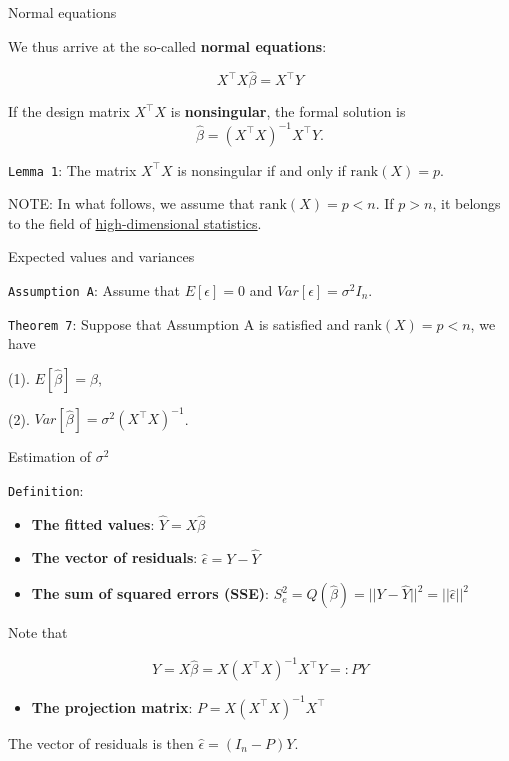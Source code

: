 \documentclass[ignorenonframetext,]{beamer}
\providecommand{\tightlist}{%
  \setlength{\itemsep}{0pt}\setlength{\parskip}{0pt}}
\begin{document}
\begin{frame}[fragile]{Normal equations}
\protect\hypertarget{normal-equations}{}

We thus arrive at the so-called \textbf{normal equations}:

\[X^\top X\hat\beta = X^\top Y\]

If the design matrix \(X^\top X\) is \textbf{nonsingular}, the formal
solution is \[\hat\beta = (X^\top X)^{-1}X^\top Y.\]

\texttt{Lemma\ 1}: The matrix \(X^\top X\) is nonsingular if and only if
\(\mathrm{rank}(X)=p\).

NOTE: In what follows, we assume that \(\mathrm{rank}(X)=p<n\). If
\(p>n\), it belongs to the field of
\href{https://en.wikipedia.org/wiki/High-dimensional_statistic}{high-dimensional
statistics}.

\end{frame}

\begin{frame}[fragile]{Expected values and variances}
\protect\hypertarget{expected-values-and-variances-1}{}

\texttt{Assumption\ A}: Assume that \(E[\epsilon]=0\) and
\(Var[\epsilon]=\sigma^2I_n\).

\texttt{Theorem\ 7}: Suppose that Assumption A is satisfied and
\(\mathrm{rank}(X)=p<n\), we have

(1). \(E[\hat\beta]=\beta,\)

(2). \(Var[\hat\beta]=\sigma^2(X^\top X)^{-1}\).

\end{frame}

\begin{frame}[fragile]{Estimation of \(\sigma^2\)}
\protect\hypertarget{estimation-of-sigma2-1}{}

\texttt{Definition}:

\begin{itemize}
\item
  \textbf{The fitted values}: \(\hat Y = X\hat\beta\)
\item
  \textbf{The vector of residuals}: \(\hat\epsilon = Y-\hat Y\)
\item
  \textbf{The sum of squared errors (SSE)}:
  \(S_e^2=Q(\hat\beta)=||Y-\hat Y||^2=||\hat\epsilon||^2\)
\end{itemize}

Note that

\[\hat Y = X\hat\beta=X(X^\top X)^{-1}X^\top Y=:PY\]

\begin{itemize}
\tightlist
\item
  \textbf{The projection matrix}: \(P = X(X^\top X)^{-1}X^\top\)
\end{itemize}

The vector of residuals is then \(\hat\epsilon=(I_n-P)Y\).

\end{frame}
\end{document}

